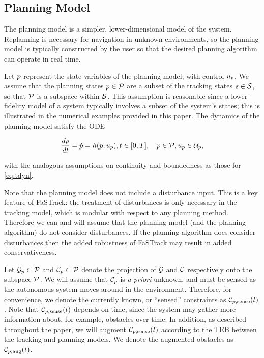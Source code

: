 \subsection{Planning Model \label{sec:planning_model}}
The planning model is a simpler, lower-dimensional model of the system.
Replanning is necessary for navigation in unknown environments, so the planning model is typically constructed by the user so that the desired planning algorithm can operate in real time.

Let $p$ represent the state variables of the planning model, with control $u_p$. 
We assume that the planning states $p \in \mathcal{P}$ are a subset of the tracking states $s \in \mathcal{S}$, so that $\mathcal{P}$ is a subspace within $\mathcal{S}$.
This assumption is reasonable since a lower-fidelity model of a system typically involves a subset of the system's states; this is illustrated in the numerical examples provided in this paper.
The dynamics of the planning model satisfy the ODE

\begin{align}
\label{eq:pdyn}
\frac{d\pstate}{d\tvar} = \dot{\pstate} = \pdyn(\pstate, \pctrl), \tvar \in [0, \thor], \quad \pstate \in \pset, \pctrl \in \pcset,
\end{align}

\noindent with the analogous assumptions on continuity and boundedness as those for \eqref{eq:tdyn}.

Note that the planning model does not include a disturbance input. 
This is a key feature of FaSTrack: the treatment of disturbances is only necessary in the tracking model, which is modular with respect to any planning method. Therefore we can and will assume that the planning model (and the planning algorithm) do not consider disturbances. If the planning algorithm does consider disturbances then the added robustness of FaSTrack may result in added conservativeness.

Let $\mathcal G_p \subset \mathcal{P}$ and $\mathcal C_p \subset \mathcal{P}$ denote the projection of $\mathcal G$ and $\mathcal C$ respectively onto the subspace $\mathcal{P}$.
We will assume that $\mathcal C_p$ is \textit{a priori} unknown, and must be sensed as the autonomous system moves around in the environment.
Therefore, for convenience, we denote the currently known, or ``sensed'' constraints as $\mathcal C_{p,\text{sense}}(t)$.
Note that $\mathcal C_{p,\text{sense}}(t)$ depends on time, since the system may gather more information about, for example, obstacles over time.
In addition, as described throughout the paper, we will augment $\mathcal C_{p,\text{sense}}(t)$ according to the TEB between the tracking and planning models.
We denote the augmented obstacles as $\mathcal C_{p,\text{aug}}(t)$.

